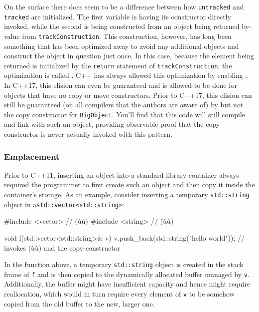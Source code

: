 \noindent On the surface there does seem to be a difference between how
\lstinline!untracked! and \lstinline!tracked! are initialized. The first
variable is having its constructor directly invoked, while the second is
being constructed from an object being returned by-value from
\lstinline!trackConstruction!. This construction, however, has long been
something that has been optimized away to avoid any additional objects
and construct the object in question just once. In this case, because
the element being returned is initialized by the \lstinline!return!
statement of \lstinline!trackConstruction!, the optimization is called
. C++ has always
allowed this optimization by enabling . In C++17,
this elision can even be guaranteed and is allowed to be done for
objects that have no copy or move constructors. Prior to C++17, this
elision can still be guaranteed (on all compilers that the authors are
aware of) by  but not  the copy
constructor for \lstinline!BigObject!. You'll find that this code will
still compile and link with such an object, providing observable proof
that the copy constructor is never actually invoked with this pattern.

\subsubsection[Emplacement]{Emplacement}\label{emplacement}

Prior to C++11, inserting an object into a standard library container
always required the programmer to first create such an object and then
copy it inside the container's storage. As an example, consider
inserting a temporary \lstinline!std::string! object in a\linebreak[4]
\mbox{\lstinline!std::vector<std::string>!}:

\begin{emcppshiddenlisting}[emcppsbatch=e11]
#include <vector>  // (ù{}ù)
#include <string>  // (ù{}ù)
\end{emcppshiddenlisting}
\begin{emcppslisting}[emcppsbatch=e11]
void f(std::vector<std::string>& v)
{
    v.push_back(std::string("hello world"));
        // invokes (ù{}ù) and the copy-constructor
}
\end{emcppslisting}

\noindent In the function above, a temporary \lstinline!std::string! object is
created in the stack frame of \lstinline!f! and is then copied to the
dynamically allocated buffer managed by \lstinline!v!. Additionally, the
buffer might have insufficient capacity and hence might require
reallocation, which would in turn require every element of \lstinline!v! to
be somehow copied from the old buffer to the new, larger one.

